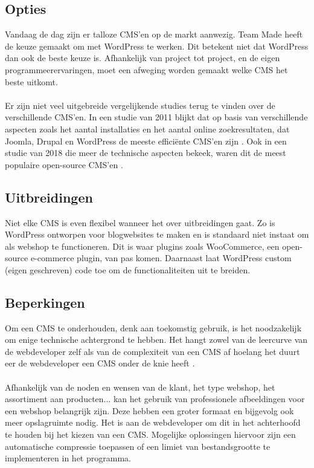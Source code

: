 \subsection{Opties}
Vandaag de dag zijn er talloze CMS'en op de markt aanwezig. Team Made heeft de keuze gemaakt om met WordPress te werken. Dit betekent niet dat WordPress dan ook de beste keuze is. Afhankelijk van project tot project, en de eigen programmeerervaringen, moet een afweging worden gemaakt welke CMS het beste uitkomt.
\\\\
Er zijn niet veel uitgebreide vergelijkende studies terug te vinden over de verschillende CMS'en. In een studie van 2011 blijkt dat op basis van verschillende aspecten zoals het aantal installaties en het aantal online zoekresultaten, dat Joomla, Drupal en WordPress de meeste efficiënte CMS'en zijn \autocite{Patel2011}. Ook in een studie van 2018 die meer de technische aspecten bekeek, waren dit de meest populaire open-source CMS'en \autocite{MartinezCaro2018}.
\subsection{Uitbreidingen}
Niet elke CMS is even flexibel wanneer het over uitbreidingen gaat. Zo is WordPress ontworpen voor blogwebsites te maken en is standaard niet instaat om als webshop te functioneren. Dit is waar plugins zoals WooCommerce, een open-source e-commerce plugin, van pas komen. Daarnaast laat WordPress custom (eigen geschreven) code toe om de functionaliteiten uit te breiden. 
\subsection{Beperkingen}
Om een CMS te onderhouden, denk aan toekomstig gebruik, is het noodzakelijk om enige technische achtergrond te hebben. Het hangt zowel van de leercurve van de webdeveloper zelf als van de complexiteit van een CMS af hoelang het duurt eer de webdeveloper een CMS onder de knie heeft \autocite{DriesBlanchaert2022}.
\\\\
Afhankelijk van de noden en wensen van de klant, het type webshop, het assortiment aan producten... kan het gebruik van professionele afbeeldingen voor een webshop belangrijk zijn. Deze hebben een groter formaat en bijgevolg ook meer opslagruimte nodig. Het is aan de webdeveloper om dit in het achterhoofd te houden bij het kiezen van een CMS. Mogelijke oplossingen hiervoor zijn een automatische compressie toepassen of een limiet van bestandsgrootte te implementeren in het programma. \autocite{LatumenRonaldDekker2004}
